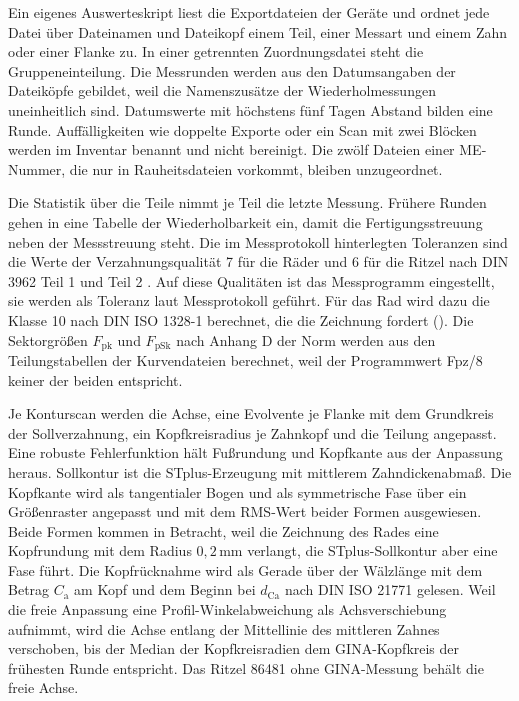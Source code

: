 Ein eigenes Auswerteskript liest die Exportdateien der Geräte und ordnet jede Datei über Dateinamen und Dateikopf einem Teil, einer Messart und einem Zahn oder einer Flanke zu. In einer getrennten Zuordnungsdatei steht die Gruppeneinteilung. Die Messrunden werden aus den Datumsangaben der Dateiköpfe gebildet, weil die Namenszusätze der Wiederholmessungen uneinheitlich sind. Datumswerte mit höchstens fünf Tagen Abstand bilden eine Runde. Auffälligkeiten wie doppelte Exporte oder ein Scan mit zwei Blöcken werden im Inventar benannt und nicht bereinigt. Die zwölf Dateien einer ME-Nummer, die nur in Rauheitsdateien vorkommt, bleiben unzugeordnet.

Die Statistik über die Teile nimmt je Teil die letzte Messung. Frühere Runden gehen in eine Tabelle der Wiederholbarkeit ein, damit die Fertigungsstreuung neben der Messstreuung steht. Die im Messprotokoll hinterlegten Toleranzen sind die Werte der Verzahnungsqualität 7 für die Räder und 6 für die Ritzel nach DIN 3962 Teil 1 und Teil 2 \cite[S.~2 bis 3]{DIN3962-1} \cite[S.~1]{DIN3962-2}. Auf diese Qualitäten ist das Messprogramm eingestellt, sie werden als Toleranz laut Messprotokoll geführt. Für das Rad wird dazu die Klasse 10 nach DIN ISO 1328-1 berechnet, die die Zeichnung fordert (). Die Sektorgrößen $F_{\mathrm{pk}}$ und $F_{\mathrm{pSk}}$ nach Anhang D der Norm werden aus den Teilungstabellen der Kurvendateien berechnet, weil der Programmwert Fpz/8 keiner der beiden entspricht.


Je Konturscan werden die Achse, eine Evolvente je Flanke mit dem Grundkreis der Sollverzahnung, ein Kopfkreisradius je Zahnkopf und die Teilung angepasst. Eine robuste Fehlerfunktion hält Fußrundung und Kopfkante aus der Anpassung heraus. Sollkontur ist die STplus-Erzeugung mit mittlerem Zahndickenabmaß. Die Kopfkante wird als tangentialer Bogen und als symmetrische Fase über ein Größenraster angepasst und mit dem RMS-Wert beider Formen ausgewiesen. Beide Formen kommen in Betracht, weil die Zeichnung des Rades eine Kopfrundung mit dem Radius $0{,}2$\,mm verlangt, die STplus-Sollkontur aber eine Fase führt. Die Kopfrücknahme wird als Gerade über der Wälzlänge mit dem Betrag $C_{\mathrm{a}}$ am Kopf und dem Beginn bei $d_{\mathrm{Ca}}$ nach DIN ISO 21771 \cite{DINISO21771} gelesen. Weil die freie Anpassung eine Profil-Winkelabweichung als Achsverschiebung aufnimmt, wird die Achse entlang der Mittellinie des mittleren Zahnes verschoben, bis der Median der Kopfkreisradien dem GINA-Kopfkreis der frühesten Runde entspricht. Das Ritzel 86481 ohne GINA-Messung behält die freie Achse.

